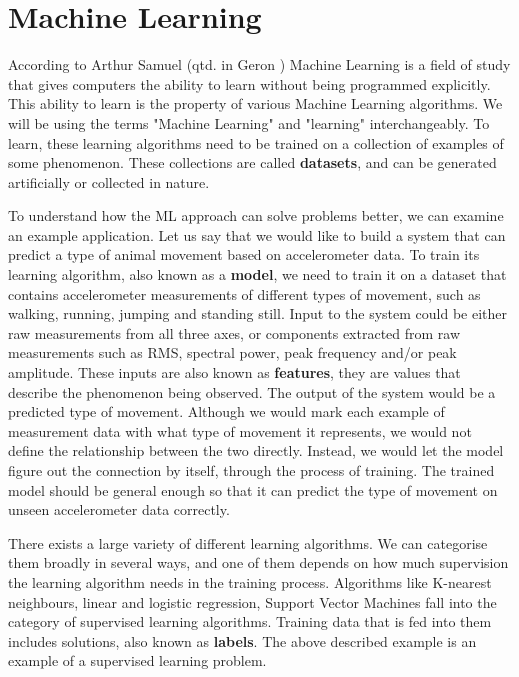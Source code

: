 \section{ Machine Learning}

According to Arthur Samuel (qtd. in Geron \cite{geron}) Machine Learning is a field of study that gives computers the ability to learn without being programmed explicitly.
This ability to learn is the property of various Machine Learning algorithms.
We will be using the terms "Machine Learning" and "learning" interchangeably. 
To learn, these learning algorithms need to be trained on a collection of examples of some phenomenon\cite{burkovml}. 
These collections are called \textbf{datasets}, and can be generated artificially or collected in nature.

To understand how the ML approach can solve problems better, we can examine an example application.
Let us say that we would like to build a system that can predict a type of animal movement based on accelerometer data.
To train its learning algorithm, also known as a \textbf{model}, we need to train it on a dataset that contains accelerometer measurements of different types of movement, such as walking, running, jumping and standing still.
Input to the system could be either raw measurements from all three axes, or components extracted from raw measurements such as RMS, spectral power, peak frequency and/or peak amplitude. 
These inputs are also known as \textbf{features}, they are values that describe the phenomenon being observed\cite{burkovml}. 
The output of the system would be a predicted type of movement.
Although we would mark each example of measurement data with what type of movement it represents, we would not define the relationship between the two directly.
Instead, we would let the model figure out the connection by itself, through the process of training.
The trained model should be general enough so that it can predict the type of movement on unseen accelerometer data correctly.

There exists a large variety of different learning algorithms. 
We can categorise them  broadly in several ways, and one of them depends on how much supervision the learning algorithm needs in the training process. 
Algorithms like K-nearest neighbours, linear and logistic regression, Support Vector Machines fall into the category of supervised learning algorithms.
Training data that is fed into them includes solutions, also known as \textbf{labels}\cite{geron}.
The above described example is an example of a supervised learning problem.

